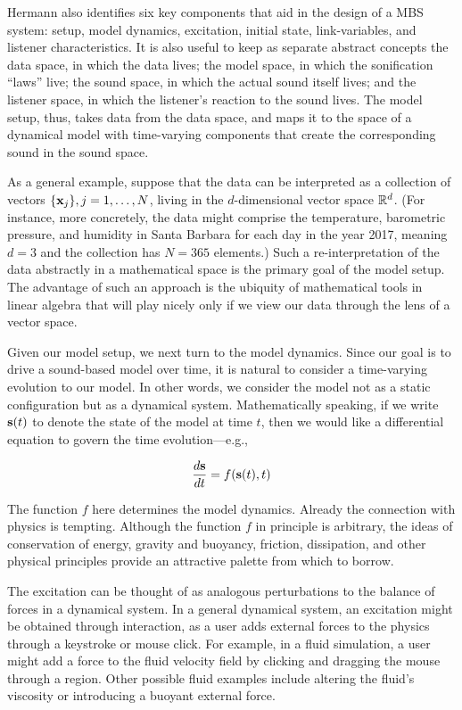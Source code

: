 Hermann also identifies six key components that aid in the design of a MBS 
system: setup, model dynamics, excitation, initial state, link-variables, and 
listener characteristics. It is also useful to keep as separate abstract 
concepts the data space, in which the data lives; the model space, in which 
the sonification ``laws'' live; the sound space, in which the actual sound 
itself lives; and the listener space, in which the listener's reaction to the 
sound lives. The model setup, thus, takes data from the data space, and maps 
it to the space of a dynamical model with time-varying components that create 
the corresponding sound in the sound space. 

As a general example, suppose that the data can be interpreted as a 
collection of vectors $\{\mathbf{x}_j\}, j=1,\dots,N$, living in the $d$-dimensional 
vector space $\mathbb{R}^d$. (For instance, more concretely, the data might comprise 
the temperature, barometric pressure, and humidity in Santa Barbara for each 
day in the year 2017, meaning $d=3$ and the collection has $N=365$ elements.) 
Such a re-interpretation of the data abstractly in a mathematical space is 
the primary goal of the model setup. The advantage of such an approach is the 
ubiquity of mathematical tools in linear algebra that will play nicely only 
if we view our data through the lens of a vector space.

Given our model setup, we next turn to the model dynamics. Since our goal is 
to drive a sound-based model over time, it is natural to consider a time-varying evolution to our model. In other words, we consider the model not as 
a static configuration but as a dynamical system. Mathematically speaking, if 
we write ${\mathbf{s}}(t)$ to denote the state of the model at time $t$, then we 
would like a differential equation to govern the time evolution---e.g.,

\begin{equation}
\frac{d{\mathbf{s}}}{dt} = f({\mathbf{s}}(t), t)
\end{equation}

The function $f$ here determines the model dynamics. Already the connection 
with physics is tempting. Although the function $f$ in principle is 
arbitrary, the ideas of conservation of energy, gravity and buoyancy, 
friction, dissipation, and other physical principles provide an attractive 
palette from which to borrow. 

The excitation can be thought of as analogous perturbations to the balance of 
forces in a dynamical system. In a general dynamical system, an excitation 
might be obtained through interaction, as a user adds external forces to the 
physics through a keystroke or mouse click. For example, in a fluid 
simulation, a user might add a force to the fluid velocity field by clicking 
and dragging the mouse through a region. Other possible fluid examples 
include altering the fluid's viscosity or introducing a buoyant external 
force. 

